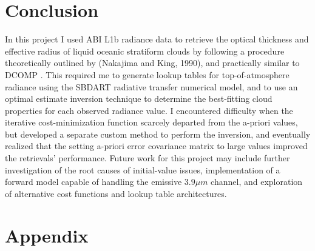 \documentclass[12pt]{article}
\begin{document}
\clearpage

\section{Conclusion}

In this project I used ABI L1b radiance data to retrieve the optical thickness and effective radius of liquid oceanic stratiform clouds by following a procedure theoretically outlined by (Nakajima and King, 1990), and practically similar to DCOMP \cite{nakajima_determination_1990}\cite{uw_algorithm_nodate}. This required me to generate lookup tables for top-of-atmosphere radiance using the SBDART radiative transfer numerical model, and to use an optimal estimate inversion technique to determine the best-fitting cloud properties for each observed radiance value. I encountered difficulty when the iterative cost-minimization function scarcely departed from the a-priori values, but developed a separate custom method to perform the inversion, and eventually realized that the setting a-priori error covariance matrix to large values improved the retrievals' performance. Future work for this project may include further investigation of the root causes of initial-value issues, implementation of a forward model capable of handling the emissive $3.9\mu m$ channel, and exploration of alternative cost functions and lookup table architectures.

\section{Appendix}

\vspace{-2em}
\end{document}
